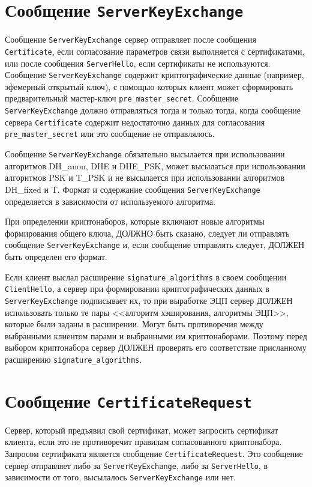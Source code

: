 \section{Сообщение \lstinline{ServerKeyExchange}}\label{HANDSHAKE.9}

Сообщение \lstinline{ServerKeyExchange} сервер отправляет после сообщения
\lstinline{Certificate}, если согласование параметров связи выполняется с
сертификатами, или после сообщения \lstinline{ServerHello}, если
сертификаты не используются. Сообщение \lstinline{ServerKeyExchange}
содержит криптографические данные (например, эфемерный открытый ключ), с
помощью которых клиент может сформировать предварительный мастер-ключ
\mbox{\lstinline|pre_master_secret|.}
Сообщение \lstinline{ServerKeyExchange}
должно отправляться тогда и только тогда, когда сообщение сервера
\lstinline{Certificate} содержит недостаточно данных для согласования
\lstinline{pre_master_secret} или это сообщение не отправлялось.

Сообщение \lstinline{ServerKeyExchange} обязательно высылается при
использовании алгоритмов DH\_anon, DHE и
DHE\_PSK, может высылаться при использовании алгоритмов
PSK и T\_PSK и не высылается при использовании
алгоритмов DH\_fixed и T. Формат и содержание
сообщения \lstinline{ServerKeyExchange} определяется в зависимости от
используемого алгоритма.

При определении криптонаборов, которые включают новые алгоритмы
формирования общего ключа, ДОЛЖНО быть сказано, следует ли отправлять
сообщение \lstinline{ServerKeyExchange} и, если сообщение отправлять
следует, ДОЛЖЕН быть определен его формат.

Если клиент выслал расширение \lstinline{signature_algorithms} в своем
сообщении \lstinline{ClientHello}, а сервер при формировании
криптографических данных в \lstinline{ServerKeyExchange} подписывает их, то
при выработке ЭЦП сервер ДОЛЖЕН использовать только те пары <<алгоритм
хэширования, алгоритмы ЭЦП>>, которые были заданы в расширении. Могут быть
противоречия между выбранными клиентом парами и выбранными им
криптонаборами. Поэтому перед выбором криптонабора сервер ДОЛЖЕН проверять
его соответствие присланному расширению \lstinline{signature_algorithms}.

\section{Сообщение \lstinline{CertificateRequest}}\label{HANDSHAKE.10}

Сервер, который предъявил свой сертификат, может запросить сертификат
клиента, если это не противоречит правилам согласованного криптонабора.
Запросом сертификата является сообщение \lstinline{CertificateRequest}. Это
сообщение сервер отправляет либо за \lstinline{ServerKeyExchange}, либо за
\lstinline{ServerHello}, в зависимости от того, высылалось
\lstinline{ServerKeyExchange} или нет.

